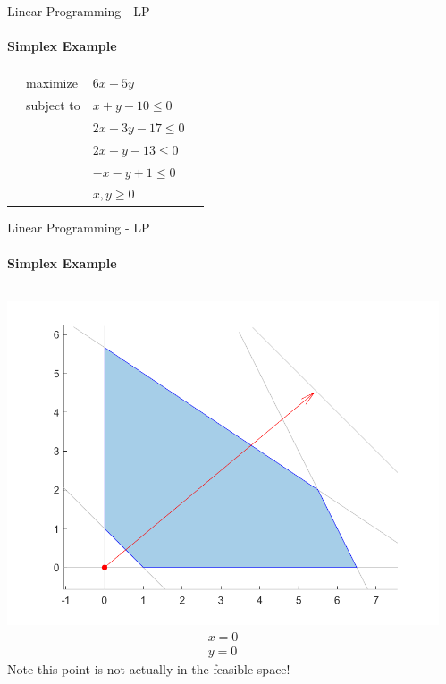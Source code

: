 \documentclass{beamer}
\begin{document}
	\begin{frame}{Linear Programming - LP}
		\framesubtitle{Simplex Example}
		\begin{tabularx}{\textwidth}{X l l X}
			& maximize		& $6x + 5y$		& \\
			& subject to	& $x + y - 10 \leq 0$	& \\
			& 				& $2x + 3y - 17 \leq 0$	& \\
			& 				& $2x + y - 13 \leq 0$ & \\
			& 				& $-x-y + 1 \leq 0$ & \\
			& 				& $x, y \geq 0$ & 
		\end{tabularx}
	\end{frame}
	
	\begin{frame}{Linear Programming - LP}
		\framesubtitle{Simplex Example}
		\begin{columns}[T]
			\begin{column}{0.33\textwidth}
				\includegraphics[width=\textwidth]{images/slides_ex3_simplex1.png}
				\begin{align*}
					x = 0\\
					y = 0
				\end{align*}
				Note this point is not actually in the feasible space!
			\end{column}
			\begin{column}{0.33\textwidth}

\end{column}
\end{columns}
\end{frame}
\end{document}
